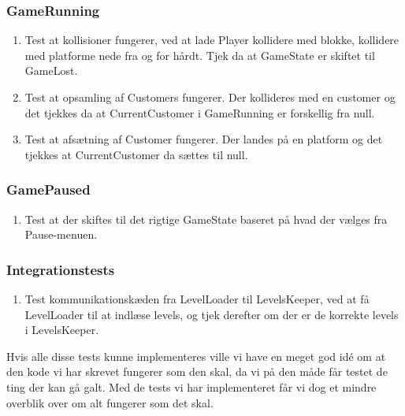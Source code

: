    \subsubsection{GameRunning}
      \begin{enumerate}
         \item Test at kollisioner fungerer, ved at lade Player kollidere med blokke, kollidere med platforme nede fra og for hårdt. Tjek da at GameState er skiftet til GameLost. 
         \item Test at opsamling af Customers fungerer. Der kollideres med en customer og det tjekkes da at CurrentCustomer i GameRunning er forskellig fra null.
         \item Test at afsætning af Customer fungerer. Der landes på en platform og det tjekkes at CurrentCustomer da sættes til null.
      \end{enumerate}
   \subsubsection{GamePaused}
      \begin{enumerate}
         \item Test at der skiftes til det rigtige GameState baseret på hvad der vælges fra Pause-menuen.
      \end{enumerate}
   \subsubsection{Integrationstests}
      \begin{enumerate}
         \item Test kommunikationskæden fra LevelLoader til LevelsKeeper, ved at få LevelLoader til at indlæse levels, og tjek derefter om der er de korrekte levels i LevelsKeeper.
      \end{enumerate}
      Hvis alle disse tests kunne implementeres ville vi have en meget god idé om at den kode vi har skrevet fungerer som den skal, da vi på den måde får testet de ting der kan gå galt. Med de tests vi har implementeret får vi dog et mindre overblik over om alt fungerer som det skal.
      